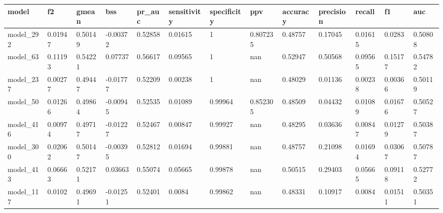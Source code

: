 \begin{tabular}{|l|l|l|l|l|l|l|l|l|l|l|l|l|}
\hline
\textbf{model} & \textbf{f2} & \textbf{gmean} & \textbf{bss} & \textbf{pr\_auc} & \textbf{sensitivity} & \textbf{specificity} & \textbf{ppv} & \textbf{accuracy} & \textbf{precision} & \textbf{recall} & \textbf{f1} & \textbf{auc} \\ \hline
model\_292     & 0.01947     & 0.50149        & -0.00372     & 0.52858          & 0.01615              & 1                    & 0.807235     & 0.48757           & 0.17045            & 0.01615         & 0.0283      & 0.50808      \\ \hline
model\_63      & 0.11193     & 0.54221        & 0.07737      & 0.56617          & 0.09565              & 1                    & nan          & 0.52947           & 0.50568            & 0.09565         & 0.15177     & 0.54782      \\ \hline
model\_237     & 0.00277     & 0.49447        & -0.01777     & 0.52209          & 0.00238              & 1                    & nan          & 0.48029           & 0.01136            & 0.00238         & 0.00366     & 0.50119      \\ \hline
model\_50      & 0.01266     & 0.49864        & -0.00945     & 0.52535          & 0.01089              & 0.99964              & 0.852305     & 0.48509           & 0.04432            & 0.01089         & 0.01676     & 0.50527      \\ \hline
model\_416     & 0.00974     & 0.49717        & -0.01227     & 0.52467          & 0.00847              & 0.99927              & nan          & 0.48295           & 0.03636            & 0.00847         & 0.01279     & 0.50387      \\ \hline
model\_300     & 0.02062     & 0.50147        & -0.00395     & 0.52812          & 0.01694              & 0.99881              & nan          & 0.48757           & 0.21098            & 0.01694         & 0.03067     & 0.50787      \\ \hline
model\_413     & 0.06663     & 0.52171        & 0.03663      & 0.55074          & 0.05665              & 0.99878              & nan          & 0.50515           & 0.29403            & 0.05665         & 0.09118     & 0.52772      \\ \hline
model\_117     & 0.0102      & 0.49691        & -0.01251     & 0.52401          & 0.0084               & 0.99862              & nan          & 0.48331           & 0.10917            & 0.0084          & 0.01511     & 0.50351      \\ \hline

\end{tabular}
